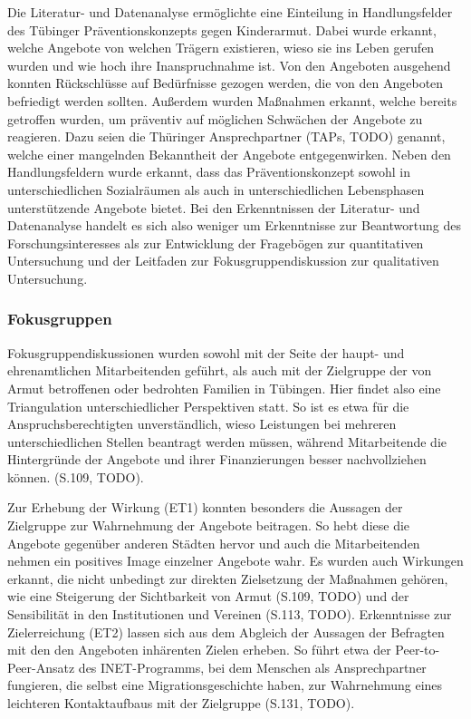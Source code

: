 Die Literatur- und Datenanalyse ermöglichte eine Einteilung in Handlungsfelder des Tübinger Präventionskonzepts gegen Kinderarmut. Dabei wurde erkannt, welche Angebote von welchen Trägern existieren, wieso sie ins Leben gerufen wurden und wie hoch ihre Inanspruchnahme ist. Von den Angeboten ausgehend konnten Rückschlüsse auf Bedürfnisse gezogen werden, die von den Angeboten befriedigt werden sollten. Außerdem wurden Maßnahmen erkannt, welche bereits getroffen wurden, um präventiv auf möglichen Schwächen der Angebote zu reagieren. Dazu seien die Thüringer Ansprechpartner (TAPs, TODO) genannt, welche einer mangelnden Bekanntheit der Angebote entgegenwirken. Neben den Handlungsfeldern wurde erkannt, dass das Präventionskonzept sowohl in unterschiedlichen Sozialräumen als auch in unterschiedlichen Lebensphasen unterstützende Angebote bietet. Bei den Erkenntnissen der Literatur- und Datenanalyse handelt es sich also weniger um Erkenntnisse zur Beantwortung des Forschungsinteresses als zur Entwicklung der Fragebögen zur quantitativen Untersuchung und der Leitfaden zur Fokusgruppendiskussion zur qualitativen Untersuchung.

\subsubsection{Fokusgruppen}

Fokusgruppendiskussionen wurden sowohl mit der Seite der haupt- und ehrenamtlichen Mitarbeitenden geführt, als auch mit der Zielgruppe der von Armut betroffenen oder bedrohten Familien in Tübingen. Hier findet also eine Triangulation unterschiedlicher Perspektiven statt. So ist es etwa für die Anspruchsberechtigten unverständlich, wieso Leistungen bei mehreren unterschiedlichen Stellen beantragt werden müssen, während Mitarbeitende die Hintergründe der Angebote und ihrer Finanzierungen besser nachvollziehen können. (S.109, TODO).

Zur Erhebung der Wirkung (ET1) konnten besonders die Aussagen der Zielgruppe zur Wahrnehmung der Angebote beitragen. So hebt diese die Angebote gegenüber anderen Städten hervor und auch die Mitarbeitenden nehmen ein positives Image einzelner Angebote wahr. Es wurden auch Wirkungen erkannt, die nicht unbedingt zur direkten Zielsetzung der Maßnahmen gehören, wie eine Steigerung der Sichtbarkeit von Armut (S.109, TODO) und der Sensibilität in den Institutionen und Vereinen (S.113, TODO). Erkenntnisse zur Zielerreichung (ET2) lassen sich aus dem Abgleich der Aussagen der Befragten mit den den Angeboten inhärenten Zielen erheben. So führt etwa der Peer-to-Peer-Ansatz des INET-Programms, bei dem Menschen als Ansprechpartner fungieren, die selbst eine Migrationsgeschichte haben, zur Wahrnehmung eines leichteren Kontaktaufbaus mit der Zielgruppe (S.131, TODO).

